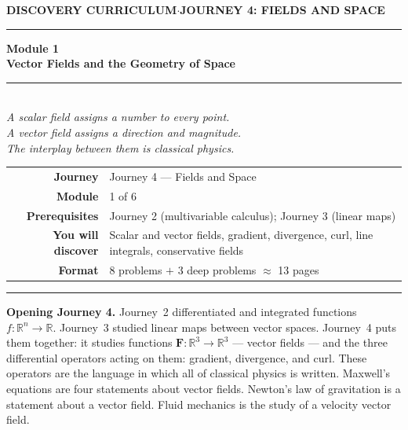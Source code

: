 \documentclass[12pt,a4paper]{article}
\newcounter{problem}
\begin{document}
\thispagestyle{empty}
\begin{center}
{\small\color{MidBlue}\textbf{DISCOVERY CURRICULUM}\quad$\cdot$\quad\textbf{JOURNEY 4: FIELDS AND SPACE}}
\vspace{0.6cm}

{\color{NavyBlue}\rule{\linewidth}{2pt}}\vspace{0.5cm}

{\Huge\bfseries\color{NavyBlue}Module 1}\\[0.3cm]
{\LARGE\bfseries\color{MidBlue}Vector Fields and the Geometry of Space}\\[0.4cm]
{\color{Gold}\rule{0.4\linewidth}{1.2pt}}\\[0.4cm]
{\large\itshape\color{DarkGrey}
A scalar field assigns a number to every point.\\[0.15cm]
A vector field assigns a direction and magnitude.\\[0.15cm]
The interplay between them is classical physics.}

\vspace{1cm}
\begin{tabular}{rl}
\color{DarkGrey}\textbf{Journey}         & Journey 4 --- Fields and Space \\[4pt]
\color{DarkGrey}\textbf{Module}          & 1 of 6 \\[4pt]
\color{DarkGrey}\textbf{Prerequisites}   & Journey 2 (multivariable calculus); Journey 3 (linear maps) \\[4pt]
\color{DarkGrey}\textbf{You will discover} & Scalar and vector fields, gradient, divergence, curl, line integrals, conservative fields \\[4pt]
\color{DarkGrey}\textbf{Format}          & 8 problems $+$ 3 deep problems $\approx$ 13 pages \\
\end{tabular}
\vspace{1cm}

{\color{NavyBlue}\rule{\linewidth}{2pt}}
\end{center}

\vspace{0.5cm}
\noindent\textbf{Opening Journey 4.}
Journey~2 differentiated and integrated functions $f:\mathbb{R}^n\to\mathbb{R}$. Journey~3 studied linear maps between vector spaces. Journey~4 puts them together: it studies functions $\mathbf{F}:\mathbb{R}^3\to\mathbb{R}^3$ --- vector fields --- and the three differential operators acting on them: gradient, divergence, and curl. These operators are the language in which all of classical physics is written. Maxwell's equations are four statements about vector fields. Newton's law of gravitation is a statement about a vector field. Fluid mechanics is the study of a velocity vector field.
\end{document}
